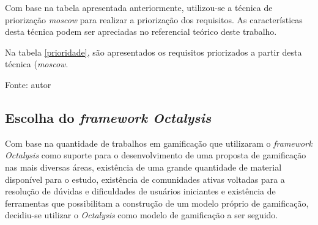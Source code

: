 Com base na tabela apresentada anteriormente, utilizou-se a técnica de priorização \textit{moscow} para realizar
a priorização dos requisitos. As características desta técnica podem ser apreciadas no referencial teórico deste trabalho.

Na tabela \ref{prioridade}, são apresentados os requisitos priorizados a partir desta técnica (\textit{moscow}.

\begin{table}[h]
	\centering
	\caption{Requisitos priorizados utilizando \textit{moscow}}
	\label{prioridade}
	Fonte: autor
\end{table}

\subsection{Escolha do \textit{framework Octalysis}}
Com base na quantidade de trabalhos em gamificação que utilizaram o \textit{framework Octalysis} como suporte para o desenvolvimento de 
uma proposta de gamificação nas mais diversas áreas, existência de uma grande quantidade de material disponível para o estudo, 
existência de comunidades ativas voltadas para a resolução de dúvidas e dificuldades de usuários iniciantes e existência de ferramentas 
que possibilitam a construção de um modelo próprio de gamificação, decidiu-se utilizar o \textit{Octalysis} como modelo de gamificação a
ser seguido.

